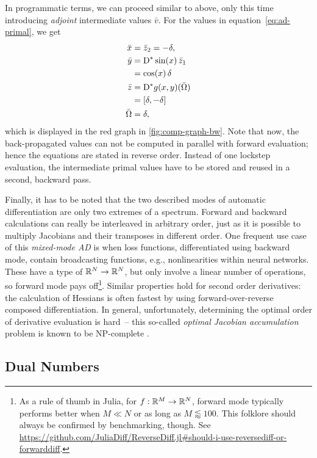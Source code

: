 In programmatic terms, we can proceed similar to above, only this time introducing \emph{adjoint}
intermediate values \(\bar{v}\).  For the values in equation~\eqref{eq:ad-primal}, we get
\begin{equation}
  \label{eq:ad-backward}
  \begin{aligned}
    \bar{x} &= \bar{z}_2 = -\delta, \\
    \bar{y} &= \mathop{}\!\mathrm{D}^{*}\sin(x) \, \bar{z}_1 \\
    &= \cos(x) \, \delta\\
    \bar{z} &= \mathop{}\!\mathrm{D}^{*} g(x, y)(\bar{\Omega}) \\
    &= [\delta, -\delta] \\
    \bar{\Omega} &= \delta,
  \end{aligned}
\end{equation}
which is displayed in the red graph in \ref{fig:comp-graph-bw}.  Note that now, the back-propagated
values can not be computed in parallel with forward evaluation; hence the equations are stated in
reverse order.  Instead of one lockstep evaluation, the intermediate primal values have to be stored
and reused in a second, backward pass.

Finally, it has to be noted that the two described modes of automatic differentiation are only two
extremes of a spectrum.  Forward and backward calculations can really be interleaved in arbitrary
order, just as it is possible to multiply Jacobians and their transposes in different order.  One
frequent use case of this \emph{mixed-mode AD} is when loss functions, differentiated using backward
mode, contain broadcasting functions, e.g., nonlinearities within neural networks.  These have a
type of \(\mathbb{R}^N \to \mathbb{R}^N\), but only involve a linear number of operations, so forward mode pays
off\footnote{As a rule of thumb in Julia, for \(f: \mathbb{R}^M \to \mathbb{R}^N\), forward mode typically
  performs better when \(M \ll N\) or as long as \(M \lessapprox 100\).  This folklore should always
  be confirmed by benchmarking, though.  See
  \url{https://github.com/JuliaDiff/ReverseDiff.jl\#should-i-use-reversediff-or-forwarddiff}.}.
Similar properties hold for second order derivatives: the calculation of Hessians is often fastest
by using forward-over-reverse composed differentiation.  In general, unfortunately, determining the
optimal order of derivative evaluation is hard~-- this so-called \emph{optimal Jacobian
  accumulation} problem is known to be NP-complete \parencite{naumann2007optimal}.

\subsection*{Dual Numbers}
\label{sec:dual-numbers}

